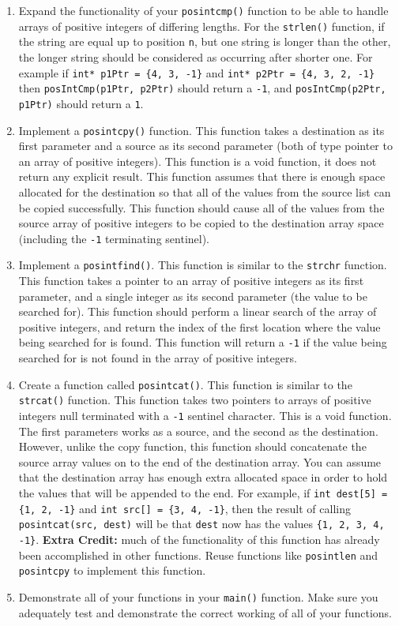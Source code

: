 \documentclass[11pt]{article}
\begin{document}
\begin{enumerate}
\item Expand the functionality of your \verb~posintcmp()~ function to be able
   to handle arrays of positive integers of differing lengths.  For
   the \verb~strlen()~ function, if the string are equal up to position \verb~n~,
   but one string is longer than the other, the longer string should
   be considered as occurring after shorter one.  For example if
   \verb~int* p1Ptr = {4, 3, -1}~ and \verb~int* p2Ptr = {4, 3, 2, -1}~
   then \verb~posIntCmp(p1Ptr, p2Ptr)~ should return a \verb~-1~, and
   \verb~posIntCmp(p2Ptr, p1Ptr)~ should return a \verb~1~.
\item Implement a \verb~posintcpy()~ function.  This function takes a
   destination as its first parameter and a source as its second
   parameter (both of type pointer to an array of positive integers).
   This function is a void function, it does not return any explicit
   result.  This function assumes that there is enough space allocated
   for the destination so that all of the values from the source list
   can be copied successfully.  This function should cause all of the
   values from the source array of positive integers to be copied to
   the destination array space (including the \verb~-1~ terminating
   sentinel).
\item Implement a \verb~posintfind()~.  This function is similar to the
   \verb~strchr~ function.  This function takes a pointer to an array of
   positive integers as its first parameter, and a single integer as
   its second parameter (the value to be searched for).  This function
   should perform a linear search of the array of positive integers,
   and return the index of the first location where the value being
   searched for is found.  This function will return a \verb~-1~ if the
   value being searched for is not found in the array of positive
   integers.
\item Create a function called \verb~posintcat()~.  This function is similar
   to the \verb~strcat()~ function.  This function takes two pointers to
   arrays of positive integers null terminated with a \verb~-1~ sentinel
   character.  This is a void function.  The first parameters works as
   a source, and the second as the destination.  However, unlike the
   copy function, this function should concatenate the source array
   values on to the end of the destination array.  You can assume that
   the destination array has enough extra allocated space in order to
   hold the values that will be appended to the end.  For example, if
   \verb~int dest[5] = {1, 2, -1}~ and \verb~int src[] = {3, 4, -1}~, then the
   result of calling \verb~posintcat(src, dest)~ will be that \verb~dest~
   now has the values \verb~{1, 2, 3, 4, -1}~.  \textbf{Extra Credit:} much of
   the functionality of this function has already been accomplished
   in other functions.  Reuse functions like \verb~posintlen~ and
   \verb~posintcpy~ to implement this function.
\item Demonstrate all of your functions in your \verb~main()~ function.  Make
   sure you adequately test and demonstrate the correct working of all
   of your functions.
\end{enumerate}
\end{document}
